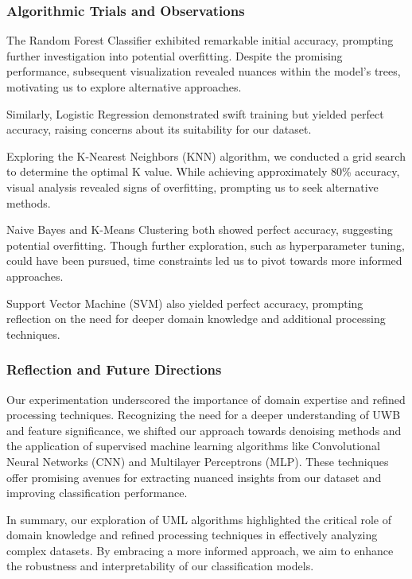 \subsubsection{Algorithmic Trials and Observations}

The Random Forest Classifier exhibited remarkable initial accuracy, prompting further investigation into potential overfitting. Despite the promising performance, subsequent visualization revealed nuances within the model's trees, motivating us to explore alternative approaches.

Similarly, Logistic Regression demonstrated swift training but yielded perfect accuracy, raising concerns about its suitability for our dataset.

Exploring the K-Nearest Neighbors (KNN) algorithm, we conducted a grid search to determine the optimal K value. While achieving approximately 80\% accuracy, visual analysis revealed signs of overfitting, prompting us to seek alternative methods.

Naive Bayes and K-Means Clustering both showed perfect accuracy, suggesting potential overfitting. Though further exploration, such as hyperparameter tuning, could have been pursued, time constraints led us to pivot towards more informed approaches.

Support Vector Machine (SVM) also yielded perfect accuracy, prompting reflection on the need for deeper domain knowledge and additional processing techniques.

\subsubsection{Reflection and Future Directions}

Our experimentation underscored the importance of domain expertise and refined processing techniques. Recognizing the need for a deeper understanding of UWB and feature significance, we shifted our approach towards denoising methods and the application of supervised machine learning algorithms like Convolutional Neural Networks (CNN) and Multilayer Perceptrons (MLP). These techniques offer promising avenues for extracting nuanced insights from our dataset and improving classification performance.

In summary, our exploration of UML algorithms highlighted the critical role of domain knowledge and refined processing techniques in effectively analyzing complex datasets. By embracing a more informed approach, we aim to enhance the robustness and interpretability of our classification models.
